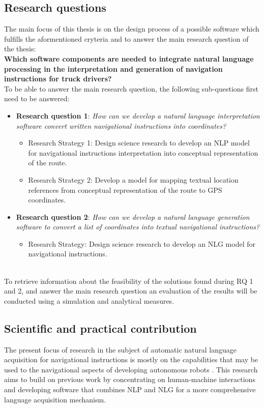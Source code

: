 \subsection{Research questions  }

The main focus of this thesis is on the design process of a possible software which fulfills the aformentioned cryteria and to answer the main research question of the thesis:  \\

 \textbf{Which software components are needed to integrate natural language processing in the interpretation and generation of navigation instructions for truck drivers?  }\\

 
To be able to answer the main research question, the following sub-questions first need to be answered: 
\begin{itemize}
    \item [] \textbf{Research question 1}: \textit{How can we develop a natural language interpretation software convert written navigational instructions into coordinates?} 
    \begin{itemize}
        \item Research Strategy 1: Design science research to develop an NLP model for navigational instructions interpretation into conceptual representation of the route. 
        \item Research Strategy 2: Develop a model for mapping textual location references from conceptual representation of the route to GPS coordinates. \\
 
    \end{itemize}
    \item[] \textbf{Research question 2}: \textit{How can we develop a natural language generation software to convert a list of coordinates into textual navigational instructions?} 
\begin{itemize}
    \item Research Strategy: Design science research to develop an NLG model for navigational instructions. 
 
\end{itemize}
\end{itemize}
\\

To retrieve information about the feasibility of the solutions found during RQ 1 and 2, and answer the main research question an evaluation of the results will be conducted using a simulation and analytical measures. 


\subsection{Scientific and practical contribution  }

The present focus of research in the subject of automatic natural language acquisition for navigational instructions is mostly on the capabilities that may be used to the navigational aspects of developing autonomous robots \cite{chen2011learning}. This research aims to build on previous work by concentrating on human-machine interactions and developing software that combines NLP and NLG for a more comprehensive language acquisition mechanism. 